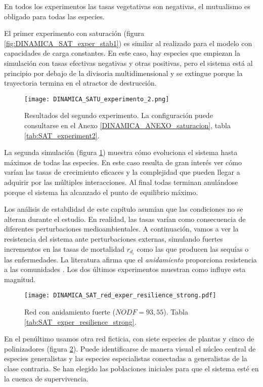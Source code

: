 En todos los experimentos las tasas vegetativas son negativas, el mutualismo es obligado para todas las especies.

El primer experimento con saturación (figura \ref{fig:DINAMICA_SAT_exper_stab1}) es similar al realizado para el modelo con capacidades de carga constantes. En este caso, hay especies que empiezan la simulación con tasas efectivas negativas y otras positivas, pero el sistema está al principio por debajo de la divisoria multidimensional y se extingue porque la trayectoria termina en el atractor de destrucción.

\begin{figure}[h!]
\centering
\texttt{[image: DINAMICA\_SATU\_experimento\_2.png]}
\caption {Resultados del segundo experimento. La configuración puede consultarse en el Anexo  \ref{DINAMICA_ANEXO_saturacion}, tabla \ref{tab:SAT_experiment2}.}
\label{fig:DINAMICA_SAT_exper_stab2}
\end{figure}

La segunda simulación (figura \ref{fig:DINAMICA_SAT_exper_stab2}) muestra cómo evoluciona el sistema hasta máximos de todas las especies. En este caso resulta de gran interés ver cómo varían las tasas de crecimiento eficaces y la complejidad que pueden llegar a adquirir por las múltiples interacciones. Al final todas terminan anulándose porque el sistema ha alcanzado el punto de equilibrio máximo. 

Los análisis de estabilidad de este capítulo asumían que las condiciones no se alteran durante el estudio. En realidad, las tasas varían como consecuencia de diferentes perturbaciones medioambientales. A continuación, vamos a ver la resistencia del sistema ante perturbaciones externas, simulando fuertes incrementos en las tasas de mortalidad $r_{d_i}$ como las que producen las sequías o las enfermedades. La literatura afirma que el \emph{anidamiento} proporciona resistencia a las comunidades \citep{bascompte2003nested}. Los dos últimos experimentos muestran como influye esta magnitud.

\begin{figure}[h!]
\centering
\texttt{[image: DINAMICA\_SAT\_red\_exper\_resilience\_strong.pdf]}
\caption {Red con anidamiento fuerte ($NODF = 93,55$). Tabla \ref{tab:SAT_exper_resilience_strong}.}
\label{fig:DINAMICA_SAT_red_exper_resilience_strong}
\end{figure}

En el penúltimo usamos otra red ficticia, con siete especies de plantas y cinco de polinizadores (figura \ref{fig:DINAMICA_SAT_red_exper_resilience_strong}). Puede identificarse de manera visual el núcleo central de especies generalistas y las especies especialistas conectadas a generalistas de la clase contraria. Se han elegido las poblaciones iniciales para que el sistema esté en la cuenca de supervivencia.

